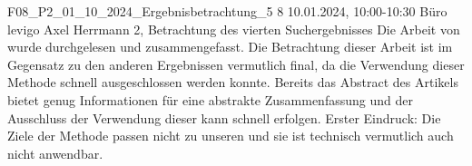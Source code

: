 \fieldnote
{F08\_P2\_01\_10\_2024\_Ergebnisbetrachtung\_5}
{8}
{10.01.2024, 10:00-10:30}
{Büro levigo}
{Axel Herrmann}
{2, Betrachtung des vierten Suchergebnisses}
{
  Die Arbeit von  wurde durchgelesen und zusammengefasst.
}
{
  Die Betrachtung dieser Arbeit ist im Gegensatz zu den anderen Ergebnissen vermutlich final, da die Verwendung dieser Methode schnell ausgeschlossen werden konnte.
}
{
  Bereits das Abstract des Artikels bietet genug Informationen für eine abstrakte Zusammenfassung und der Ausschluss der Verwendung dieser kann schnell erfolgen.
}
{}
{
  Erster Eindruck: Die Ziele der Methode passen nicht zu unseren und sie ist technisch vermutlich auch nicht anwendbar.
}
